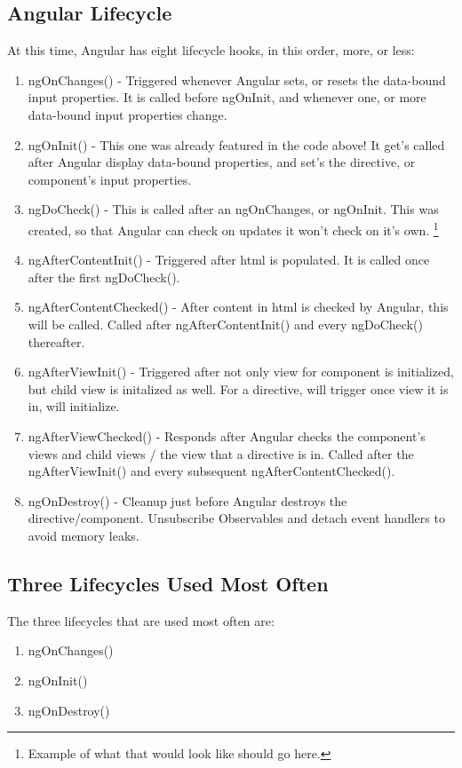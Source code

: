 \subsection{ Angular Lifecycle }
At this time, Angular has eight lifecycle hooks, in this order, more, or less:
\begin{enumerate}
  \item ngOnChanges() - Triggered whenever Angular sets, or resets the data-bound
  input properties. It is called before ngOnInit, and whenever one, or more
  data-bound input properties change.
  \item ngOnInit() - This one was already featured in the code above! It get's
  called after Angular display data-bound properties, and set's the directive,
  or component's input properties.
  \item ngDoCheck() - This is called after an ngOnChanges, or ngOnInit. This
  was created, so that Angular can check on updates it won't check on it's own.
  \footnote{Example of what that would look like should go here.}
  \item ngAfterContentInit() - Triggered after html is populated. It is called
  once after the first ngDoCheck().
  \item ngAfterContentChecked() - After content in html is checked by Angular,
  this will be called. Called after ngAfterContentInit() and every ngDoCheck()
  thereafter.
  \item ngAfterViewInit() - Triggered after not only view for component is
  initialized, but child view is initalized as well. For a directive, will
  trigger once view it is in, will initialize.
  \item ngAfterViewChecked() - Responds after Angular checks the component's
  views and child views / the view that a directive is in. Called after the
  ngAfterViewInit() and every subsequent ngAfterContentChecked().
  \item ngOnDestroy() - Cleanup just before Angular destroys the
  directive/component. Unsubscribe Observables and detach event handlers to
  avoid memory leaks.
\end{enumerate}

\subsection{ Three Lifecycles Used Most Often }
The three lifecycles that are used most often are:
\begin{enumerate}
  \item ngOnChanges()
  \item ngOnInit()
  \item ngOnDestroy()
\end{enumerate}

